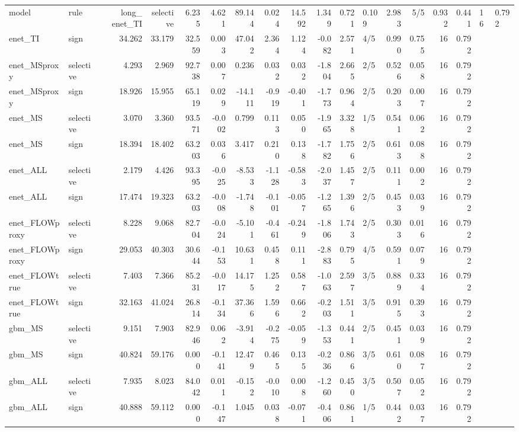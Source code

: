 \begin{tabular}{llrrrrrrrrrlrrrr}
\toprule
model & rule & long_%
\midrule
enet_TI & selective & 6.235 & 4.621 & 89.144 & 0.024 & 14.592 & 1.349 & 0.721 & 0.109 & 2.983 & 5/5 & 0.932 & 0.441 & 16 & 0.792 \\
enet_TI & sign & 34.262 & 33.179 & 32.559 & 0.003 & 47.042 & 2.364 & 1.124 & -0.082 & 2.571 & 4/5 & 0.990 & 0.755 & 16 & 0.792 \\
enet_MSproxy & selective & 4.293 & 2.969 & 92.738 & 0.007 & 0.236 & 0.032 & 0.032 & -1.804 & 2.665 & 2/5 & 0.526 & 0.058 & 16 & 0.792 \\
enet_MSproxy & sign & 18.926 & 15.955 & 65.119 & 0.029 & -14.111 & -0.919 & -0.401 & -1.773 & 0.964 & 2/5 & 0.203 & 0.007 & 16 & 0.792 \\
enet_MS & selective & 3.070 & 3.360 & 93.571 & -0.002 & 0.799 & 0.113 & 0.050 & -1.965 & 3.328 & 1/5 & 0.541 & 0.062 & 16 & 0.792 \\
enet_MS & sign & 18.394 & 18.402 & 63.203 & 0.036 & 3.417 & 0.210 & 0.138 & -1.782 & 1.756 & 2/5 & 0.613 & 0.088 & 16 & 0.792 \\
enet_ALL & selective & 2.179 & 4.426 & 93.395 & -0.025 & -8.533 & -1.128 & -0.583 & -2.037 & 1.457 & 2/5 & 0.111 & 0.002 & 16 & 0.792 \\
enet_ALL & sign & 17.474 & 19.323 & 63.203 & -0.008 & -1.748 & -0.101 & -0.057 & -1.265 & 1.396 & 2/5 & 0.453 & 0.039 & 16 & 0.792 \\
enet_FLOWproxy & selective & 8.228 & 9.068 & 82.704 & -0.024 & -5.101 & -0.461 & -0.249 & -1.806 & 1.743 & 2/5 & 0.303 & 0.016 & 16 & 0.792 \\
enet_FLOWproxy & sign & 29.053 & 40.303 & 30.644 & -0.153 & 10.631 & 0.458 & 0.111 & -2.883 & 0.795 & 4/5 & 0.591 & 0.079 & 16 & 0.792 \\
enet_FLOWtrue & selective & 7.403 & 7.366 & 85.231 & -0.017 & 14.175 & 1.252 & 0.587 & -1.063 & 2.597 & 3/5 & 0.889 & 0.334 & 16 & 0.792 \\
enet_FLOWtrue & sign & 32.163 & 41.024 & 26.814 & -0.134 & 37.366 & 1.596 & 0.662 & -0.203 & 1.511 & 3/5 & 0.915 & 0.393 & 16 & 0.792 \\
gbm_MS & selective & 9.151 & 7.903 & 82.946 & 0.062 & -3.914 & -0.275 & -0.059 & -1.353 & 0.441 & 2/5 & 0.451 & 0.039 & 16 & 0.792 \\
gbm_MS & sign & 40.824 & 59.176 & 0.000 & -0.141 & 12.479 & 0.465 & 0.135 & -0.236 & 0.866 & 3/5 & 0.610 & 0.087 & 16 & 0.792 \\
gbm_ALL & selective & 7.935 & 8.023 & 84.042 & 0.011 & -0.152 & -0.010 & 0.008 & -1.260 & 0.450 & 3/5 & 0.507 & 0.052 & 16 & 0.792 \\
gbm_ALL & sign & 40.888 & 59.112 & 0.000 & -0.147 & 1.045 & 0.038 & -0.071 & -0.406 & 0.861 & 1/5 & 0.442 & 0.037 & 16 & 0.792 \\
\bottomrule
\end{tabular}
